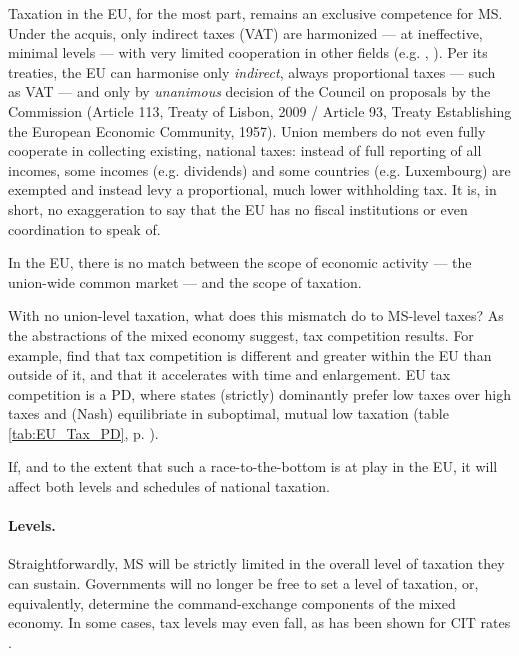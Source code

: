 \documentclass[11pt,a4paper,oneside,openright]{article}
\begin{document}

Taxation in the \gls{EU}, for the most part, remains an exclusive competence for \gls{MS}. Under the acquis, only indirect taxes (VAT) are harmonized --- at ineffective, minimal levels --- with very limited cooperation in other fields (e.g. \citealt{EuropeanCommission2009}, \citealt{TaxCoordinationandTaxCompetitionintheEuropeanUnion-EvaluatingtheCodeofConductonBusinessTaxation2001}). 
Per its treaties, the \gls{EU} can harmonise only \emph{indirect}, always proportional taxes --- such as \gls{VAT} --- and only by \emph{unanimous} decision of the Council on proposals by the Commission (Article 113, Treaty of Lisbon, 2009 / Article 93, Treaty Establishing the European Economic Community, 1957). 
Union members do not even fully cooperate in collecting existing, national taxes: 
instead of full reporting of all incomes, some incomes (e.g. dividends) and some countries (e.g. Luxembourg) are exempted and instead levy a proportional, much lower withholding tax. 
It is, in short, no exaggeration to say that the \gls{EU} has no fiscal institutions or even coordination to speak of.

In the \gls{EU}, there is no match between the scope of economic activity --- the union-wide common market --- and the scope of taxation. 

With no union-level taxation, what does this mismatch do to 
\gls{MS}-level taxes? 
As the abstractions of the mixed economy suggest, tax competition results. 
For example, \cite{Genschel2009} find that tax competition is different and greater within the \gls{EU} than outside of it, and that it accelerates with time and enlargement. 
\gls{EU} tax competition is a \gls{PD}, where states (strictly) dominantly prefer low taxes over high taxes and (Nash) equilibriate in suboptimal, mutual low taxation (table \ref{tab:EU_Tax_PD}, p. \pageref{tab:EU_Tax_PD}).



If, and to the extent that such a race-to-the-bottom is at play in the \gls{EU}, it will affect both levels and schedules of national taxation.

\paragraph{Levels.} Straightforwardly, \gls{MS} will be strictly limited in the overall level of taxation they can sustain. 
Governments will no longer be free to set a level of taxation, or, equivalently, determine the command-exchange components of the mixed economy. 
In some cases, tax levels may even fall, as has been shown for \gls{CIT} rates \citep{Piatkowski2008}.
\end{document}
